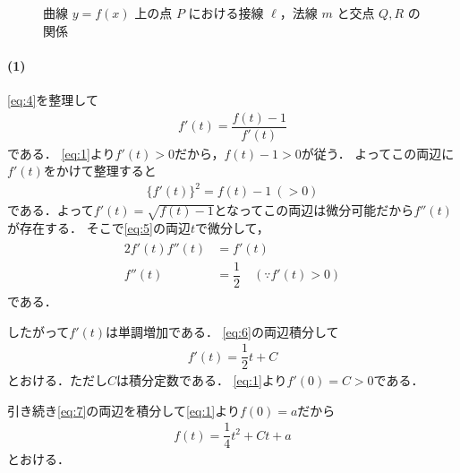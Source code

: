 \documentclass[../../main.tex]{subfiles}
\begin{document}
\begin{figure}[htb]
\begin{center}
  \end{center}
  \caption{曲線 $y=f(x)$ 上の点 $P$ における接線 $\ell$，法線 $m$ と交点 $Q, R$ の関係}
\end{figure}

\paragraph{(1)}

\cref{eq:4}を整理して
\begin{align}
  f'(t) = \dfrac{f(t)-1}{f'(t)}
\end{align}
である．
\cref{eq:1}より$f'(t)>0$だから，$f(t)-1>0$が従う．
よってこの両辺に$f'(t)$をかけて整理すると
\begin{align}
  \{f'(t)\}^2=f(t)-1 \ (>0) \label{eq:5}
\end{align}
である．よって$f'(t)=\sqrt{f(t)-1}$となってこの両辺は微分可能だから$f''(t)$が存在する．
そこで\cref{eq:5}の両辺$t$で微分して，
\begin{align}
  \begin{split}
    2f'(t)f''(t)&=f'(t) \\
    f''(t)&=\dfrac{1}{2} \quad(\because f'(t)>0) \label{eq:6}
  \end{split}
\end{align}
である．

したがって$f'(t)$は単調増加である．
\cref{eq:6}の両辺積分して
\begin{align}
  f'(t)=\dfrac{1}{2}t+C \label{eq:7}
\end{align}
とおける．ただし$C$は積分定数である．
\cref{eq:1}より$f'(0)=C>0$である．

引き続き\cref{eq:7}の両辺を積分して\cref{eq:1}より$f(0)=a$だから
\begin{align}
  f(t)=\dfrac{1}{4}t^2+Ct+a \label{eq:8}
\end{align}
とおける．
\end{document}
